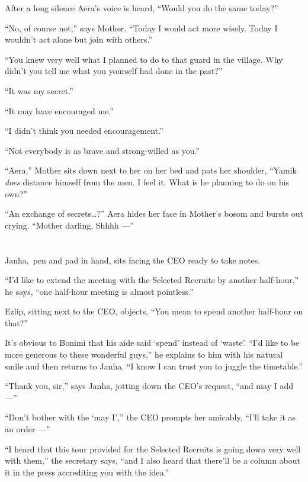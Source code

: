 \documentclass[twoside,11pt,openany]{book}
\begin{document}
After a long silence Aera's voice is heard, ``Would you do the same today?''

``No, of course not,'' says Mother. ``Today I would act more wisely. Today I
wouldn't act alone but join with others.''

``You knew very well what I planned to do to that guard in the village. Why didn't you tell me what you
yourself had done in the past?''

``It was my secret.''

``It may have encouraged me.''

``I didn't think you needed encouragement.''

``Not everybody is as brave and strong-willed as you.''

``Aera,'' Mother sits down next to her on her bed and pats her shoulder, ``Yamik
\textit{does} distance himself from the men. I feel it. What is he planning to do on his own?''

``An exchange of secrets{\ldots}?'' Aera hides her face in Mother's bosom and bursts out
crying. ``Mother darling, Shhhh ---''


\chapter{}

Janha,~pen and pad in hand, sits facing the CEO ready to take notes.

``I'd like to extend the meeting with the Selected Recruits by another half-hour,'' he says,
``one half-hour meeting is almost pointless.''

Ezlip, sitting next to the CEO, objects, ``You mean to spend another half-hour on that?''

It's obvious to Bonimi that his aide said `spend' instead of `waste'. ``I'd like to be more generous to
these wonderful guys,'' he explains to him with his natural smile and then returns to Janha,
``I know I can trust you to juggle the timetable.''

``Thank you, sir,'' says Janha, jotting down the CEO's request, ``and may I add ---''

``Don't bother with the `may I','' the CEO prompts her amicably, ``I'll take
it as an order ---''

``I heard that this tour provided for the Selected Recruits is going down very well with
them,'' the secretary says, ``and I also heard that there'll be a column about it in the
press accrediting you with the idea.''
\end{document}
